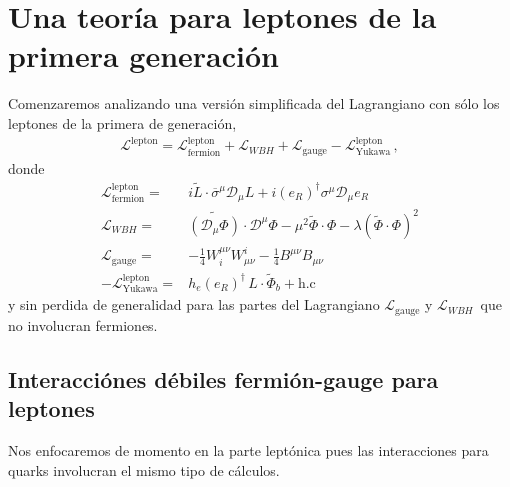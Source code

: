 \section{Una teoría para leptones de la primera generación}
\begin{frame}
Comenzaremos analizando una versión simplificada del Lagrangiano con sólo los leptones de la primera de generación,
\begin{align}
  \mathcal{L}^{\text{lepton}}=\mathcal{L}_{\text{fermion}}^{\text{lepton}}+
   \mathcal{L}_{WBH}+\mathcal{L}_{\text{gauge}}-\mathcal{L}_{\text{Yukawa}}^{\text{lepton}}\,,
\end{align}
donde
\begin{align}
  \label{eq:smscalarlep}
\mathcal{L}_{\text{fermion}}^{\text{lepton}}=&i\widetilde{L}\cdot \overline{\sigma}^\mu\mathcal{D}_\mu L 
+i(e_R)^{\dagger}\sigma^\mu\mathcal{D}_\mu {e_R}\nonumber\\
  \mathcal{L}_{WBH}=&\widetilde{\left( \mathcal{D}_\mu{\Phi} \right)}\cdot\mathcal{D}^\mu\Phi-\mu^2\widetilde{\Phi}\cdot\Phi-\lambda \left( \widetilde{\Phi}\cdot\Phi \right)^2 \nonumber\\
\mathcal{L}_{\text{gauge}}=& -\tfrac{1}{4}W^{\mu\nu}_i W_{\mu\nu}^i-\tfrac{1}{4}B^{\mu\nu} B_{\mu\nu}\nonumber\\
-\mathcal{L}_{\text{Yukawa}}^{\text{lepton}}=&  h_e \left( e_R \right)^{\dagger}\,L\cdot \widetilde{\Phi}_b +\text{h.c}
\end{align}
y sin perdida de generalidad para las partes del Lagrangiano $\mathcal{L}_{\text{gauge}}$ y $ \mathcal{L}_{WBH}\,$ que no involucran fermiones.
\end{frame}

\subsection{Interacciónes débiles fermión-gauge para leptones}

Nos enfocaremos de momento en la parte leptónica pues las interacciones para quarks involucran el mismo tipo de cálculos.

